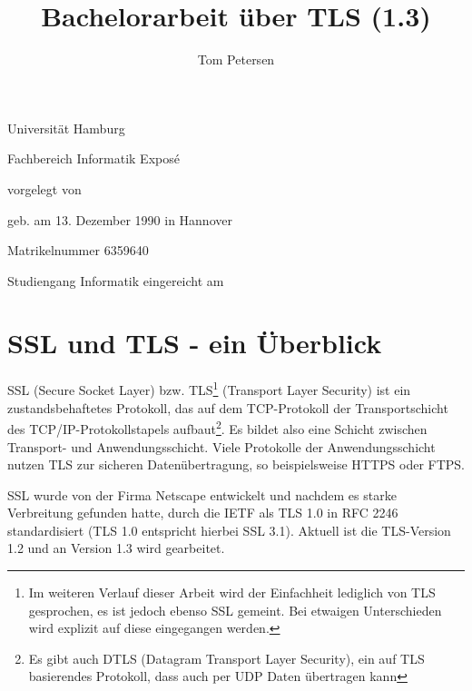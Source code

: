 \documentclass[
    12pt,
    headings=small,
    parskip=half,           %
    bibliography=totoc,
    numbers=noenddot,       %
    open=any,               %
    ]{scrreprt}
\title{Bachelorarbeit über TLS (1.3)}
\author{Tom Petersen}
\begin{document}
\begin{titlepage}
\begin{center}\Large
	Universität Hamburg \par
	Fachbereich Informatik
	\vfill
	Exposé %
	\vfill
	\makeatletter
	{\Large\textsf{\textbf{\@title}}\par}
	\makeatother
	\vfill
	vorgelegt von
	\par\bigskip
	\makeatletter
	{\@author} \par
	\makeatother
	geb. am 13. Dezember 1990 in Hannover \par
	Matrikelnummer 6359640 \par
	Studiengang Informatik
	\vfill
	\makeatletter
	eingereicht am {\@date}
	\makeatother
	\vfill
\end{center}
\end{titlepage}


\chapter{SSL und TLS - ein Überblick}

SSL (Secure Socket Layer) bzw. TLS\footnote{Im weiteren Verlauf dieser Arbeit wird der Einfachheit lediglich von TLS gesprochen, es ist jedoch ebenso SSL gemeint. Bei etwaigen Unterschieden wird explizit auf diese eingegangen werden.} (Transport Layer Security) ist ein zustandsbehaftetes Protokoll, das auf dem TCP-Protokoll der Transportschicht des TCP/IP-Protokollstapels aufbaut\footnote{Es gibt auch DTLS (Datagram Transport Layer Security), ein auf TLS basierendes Protokoll, dass auch per UDP Daten übertragen kann}. Es bildet also eine Schicht zwischen Transport- und Anwendungsschicht. %
Viele Protokolle der Anwendungsschicht nutzen TLS zur sicheren Datenübertragung, so beispielsweise HTTPS oder FTPS.

SSL wurde von der Firma Netscape entwickelt und nachdem es starke Verbreitung gefunden hatte, durch die IETF als TLS 1.0 in RFC 2246 standardisiert (TLS 1.0 entspricht hierbei SSL 3.1). Aktuell ist die TLS-Version 1.2 und an Version 1.3 wird gearbeitet. \cite{schmeh09}
\end{document}
